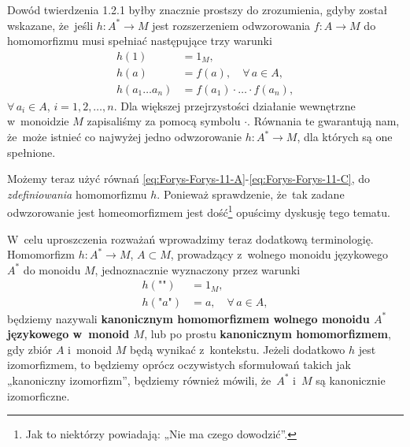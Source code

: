 \documentclass[a4paper,11pt]{article}
\begin{document}
\vspace{\spaceFour}





\start {} Dowód twierdzenia 1.2.1 byłby znacznie prostszy do
zrozumienia, gdyby został wskazane, że~jeśli $h : A^{ * } \to M$ jest
rozszerzeniem odwzorowania $f : A \to M$ do homomorfizmu musi spełniać
następujące trzy warunki
\begin{subequations}
  \begin{align}
    \label{eq:Forys-Forys-11-A}
    h( 1 ) &= 1_{ M }, \\
    \label{eq:Forys-Forys-11-B}
    h( a ) &= f( a ), \quad \forall \, a \in A, \\
    \label{eq:Forys-Forys-11-C}
    h( a_{ 1 } \ldots a_{ n } )
           &= f( a_{ 1 } ) \cdot \ldots \cdot f( a_{ n } ),
  \end{align}
\end{subequations}
$\forall \, a_{ i } \in A$, $i = 1, 2, \ldots, n$. Dla większej przejrzystości działanie
wewnętrzne w~monoidzie $M$ zapisaliśmy za pomocą symbolu $\cdot$. Równania te
gwarantują nam, że~może istnieć co najwyżej jedno odwzorowanie
$h : A^{ * } \to M$, dla których są one spełnione.

Możemy teraz użyć równań
\eqref{eq:Forys-Forys-11-A}-\eqref{eq:Forys-Forys-11-C}, do
\textit{zdefiniowania} homomorfizmu $h$. Ponieważ sprawdzenie, że~tak zadane
odwzorowanie jest homeomorfizmem jest dość\footnote{Jak to niektórzy
  powiadają: „Nie ma czego dowodzić”.} opuścimy dyskusję tego tematu.

\vspace{\spaceFour}





\start {} W~celu uproszczenia rozważań wprowadzimy teraz dodatkową
terminologię. Homomorfizm $h : A^{ * } \to M$, $A \subset M$, prowadzący z~wolnego
monoidu językowego $A^{ * }$ do monoidu $M$, jednoznacznie wyznaczony przez
warunki
\begin{subequations}
  \begin{align}
    \label{eq:Forys-Forys-12-A}
    h( \texttt{""} ) &= 1_{ M }, \\
    \label{eq:Forys-Forys-12-B}
    h( \texttt{"} a \texttt{"} ) &= a, \quad
                                   \forall \, a \in A,
  \end{align}
\end{subequations}
będziemy nazywali \textbf{kanonicznym homomorfizmem wolnego monoidu $A^{ * }$
  językowego w~monoid $M$}, lub po prostu \textbf{kanonicznym
  homomorfizmem}, gdy zbiór $A$ i~monoid $M$ będą wynikać z~kontekstu.
Jeżeli dodatkowo $h$ jest izomorfizmem, to będziemy oprócz oczywistych
sformułowań takich jak „kanoniczny izomorfizm”, będziemy również mówili,
że~$A^{ * }$ i~$M$ są kanonicznie izomorficzne.
\end{document}
